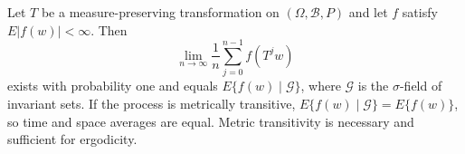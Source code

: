 Let $T$ be a measure-preserving transformation on $(\Omega, \mathcal{B}, P)$ and let $f$ satisfy $E|f(w)| < \infty$. Then
$$\lim_{n \to \infty} \frac{1}{n} \sum_{j=0}^{n-1} f(T^j w)$$
exists with probability one and equals $E\{f(w) \mid \mathcal{G}\}$, where $\mathcal{G}$ is the $\sigma$-field of invariant sets. If the process is metrically transitive, $E\{f(w) \mid \mathcal{G}\} = E\{f(w)\}$, so time and space averages are equal. Metric transitivity is necessary and sufficient for ergodicity.
